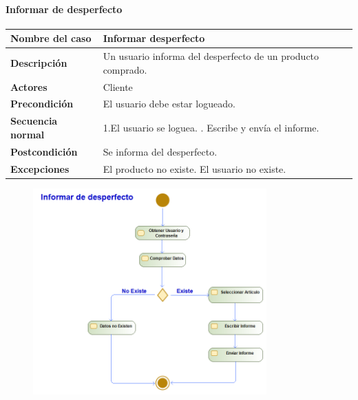 \paragraph{Informar de desperfecto}
\begin{table}[H]
	\centering
	\small
	\begin{tabularx}{0.8\textwidth}{|p{3.5cm}|X|}
		\hline
		\rowcolor{lightgray}
		\textbf{Nombre del caso}  & \textbf{Informar desperfecto}                               \\
		\hline
		\textbf{Descripción}      & Un usuario informa del desperfecto de un producto comprado. \\
		\hline
		\textbf{Actores}          & Cliente                                                     \\
		\hline
		\textbf{Precondición}     & El usuario debe estar logueado.                             \\
		\hline
		\textbf{Secuencia normal} & 1.El usuario se loguea. \newline
		2. Escribe y envía el informe.                                                          \\
		\hline
		\textbf{Postcondición}    & Se informa del desperfecto.                                 \\
		\hline
		\textbf{Excepciones}      & El producto no existe.
		\newline El usuario no existe.                                                          \\
		\hline
	\end{tabularx}
\end{table}
\begin{figure}[H]
	\centering
	\includegraphics[width=0.8\textwidth]{Use_Cases/informar_de_desperfecto.png}
\end{figure}
\newpage

